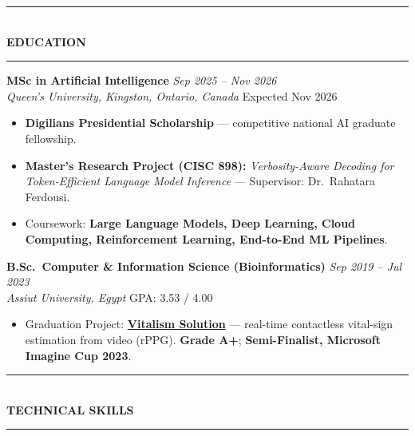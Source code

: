 \documentclass[10pt, a4paper]{article}
\newcommand{\cvsection}[1]{%
  \vspace{3pt}%
  {\color{navy}\rule{\linewidth}{1.1pt}}\\[0.5pt]%
  {\color{navy}\bfseries\fontsize{9.5}{11}\selectfont\uppercase{#1}}\\[-4pt]%
  {\color{teal}\rule{\linewidth}{0.6pt}}%
  \vspace{2pt}%
}
\newcommand{\cventry}[4]{%
  \vspace{2.5pt}%
  \textbf{\color{darkgray}#1} \hfill {\color{midgray}\textit{#3}}\\[-1.5pt]%
  {\color{teal}\textit{#2}} \hfill {\color{midgray}#4}%
}
\newenvironment{cvitems}{%
  \begin{itemize}[leftmargin=11pt, itemsep=0.5pt, parsep=0pt, topsep=1pt,
                  label={\textcolor{teal}{$\bullet$}}]
}{%
  \end{itemize}%
}
\begin{document}
\cvsection{Education}

\cventry{MSc in Artificial Intelligence}{Queen's University, Kingston, Ontario, Canada}
        {Sep 2025 -- Nov 2026}{Expected Nov 2026}
\begin{cvitems}
  \item \textbf{Digilians Presidential Scholarship} --- competitive national AI graduate fellowship.
  \item \textbf{Master's Research Project (CISC 898):} \textit{Verbosity-Aware Decoding for Token-Efficient Language Model Inference} --- Supervisor: Dr.\ Rahatara Ferdousi.
  \item Coursework: \textbf{Large Language Models, Deep Learning, Cloud Computing, Reinforcement Learning, End-to-End ML Pipelines}.
\end{cvitems}

\cventry{B.Sc.\ Computer \& Information Science (Bioinformatics)}{Assiut University, Egypt}
        {Sep 2019 -- Jul 2023}{GPA: 3.53 / 4.00}
\begin{cvitems}
  \item Graduation Project: \href{https://vitalismsolution.github.io/}{\textbf{Vitalism Solution}} --- real-time contactless vital-sign estimation from video (rPPG). \textbf{Grade A+}; \textbf{Semi-Finalist, Microsoft Imagine Cup 2023}.
\end{cvitems}

\cvsection{Technical Skills}
\end{document}

